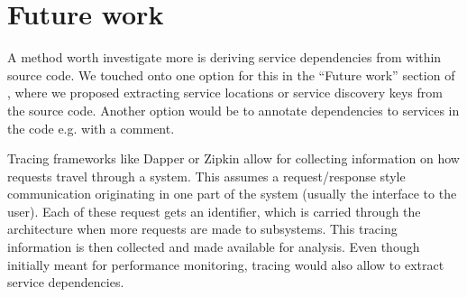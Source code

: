 


\section{Future work}
\label{section:graph_future_work}


A method worth investigate more is deriving service dependencies from within source code. We touched onto one option for this in the ``Future work'' section of , where we proposed extracting service locations or service discovery keys from the source code. Another option would be to annotate dependencies to services in the code e.g. with a comment.

Tracing frameworks like Dapper \cite{dapper} or Zipkin \cite{zipkin} allow for collecting information on how requests travel through a system. This assumes a request/response style communication originating in one part of the system (usually the interface to the user). Each of these request gets an identifier, which is carried through the architecture when more requests are made to subsystems. This tracing information is then collected and made available for analysis. Even though initially meant for performance monitoring, tracing would also allow to extract service dependencies.


